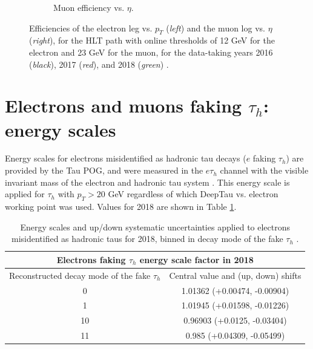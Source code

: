 \begin{figure}[h]
\begin{subfigure}{0.45\textwidth}
        \caption{Muon efficiency vs. $\eta$.}
        \label{fig:muon_efficiency_vs_eta_emu}
    \end{subfigure}
    \caption[Efficiencies of the electron leg vs. $p_{T}$ (\textit{left}) and the muon log vs. $\eta$ (\textit{right}), for the HLT path with online thresholds of 12 GeV for the electron and 23 GeV for the muon, with the data-taking years 2016 through 2018 overlaid.]{Efficiencies of the electron leg vs. $p_{T}$ (\textit{left}) and the muon log vs. $\eta$ (\textit{right}), for the HLT path with online thresholds of 12 GeV for the electron and 23 GeV for the muon, for the data-taking years 2016 (\textit{black}), 2017 (\textit{red}), and 2018 (\textit{green}) \cite{CMS-DP-2019-025}.} 
\end{figure}


\section{Electrons and muons faking $\tau_{h}$: energy scales}

Energy scales for electrons misidentified as hadronic tau decays ($e$ faking $\tau_{h}$) are provided by the Tau POG, and were measured in the $e\tau_{h}$ channel with the visible invariant mass of the electron and hadronic tau system \cite{twiki_HiggsToTauTauWorkingLegacyRun2}. This energy scale is applied for $\tau_{h}$ with $p_{T} > 20$ GeV regardless of which DeepTau vs. electron working point was used. Values for 2018 are shown in Table \ref{table:electron-faking-tauh-FES-2018}.

\begin{table}[h]
    \centering
    \begin{tabular}{|c|c|}
    \hline
    \multicolumn{2}{|c|}{Electrons faking $\tau_{h}$ energy scale factor in 2018}      \\ \hline
    \hline
    Reconstructed decay mode of the fake $\tau_{h}$  & Central value and (up, down) shifts \\ \hline
    0   & 1.01362 (+0.00474, -0.00904) \\
    1   & 1.01945 (+0.01598, -0.01226) \\
    10  & 0.96903 (+0.0125, -0.03404) \\
    11 & 0.985 (+0.04309, -0.05499) \\ \hline
    \end{tabular}
    \caption[Energy scales and up/down systematic uncertainties applied to electrons misidentified as hadronic taus.]{Energy scales and up/down systematic uncertainties applied to electrons misidentified as hadronic taus for 2018, binned in decay mode of the fake $\tau_{h}$ \cite{twiki_HiggsToTauTauWorkingLegacyRun2}.}
    \label{table:electron-faking-tauh-FES-2018}
\end{table}


